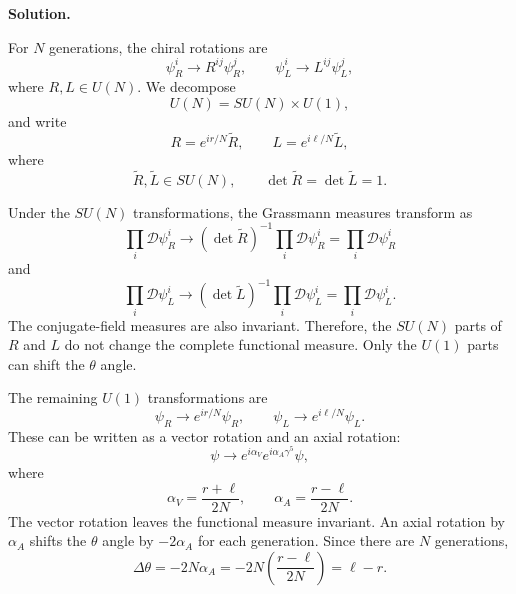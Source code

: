 \documentclass[a4paper,11pt]{article}
\newenvironment{solution}{\par\medskip\noindent\textbf{Solution.}\par\smallskip}{\par\medskip}
\begin{document}
\begin{solution}
For $N$ generations, the chiral rotations are
\begin{equation}
    \psi_R^i\to R^{ij}\psi_R^j,
    \qquad
    \psi_L^i\to L^{ij}\psi_L^j,
\end{equation}
where $R,L\in U(N)$. We decompose
\begin{equation}
    U(N)=SU(N)\times U(1),
\end{equation}
and write
\begin{equation}
    R=e^{ir/N}\widetilde R,
    \qquad
    L=e^{i\ell/N}\widetilde L,
\end{equation}
where
\begin{equation}
    \widetilde R,\widetilde L\in SU(N),
    \qquad
    \det\widetilde R=\det\widetilde L=1.
\end{equation}

Under the $SU(N)$ transformations, the Grassmann measures transform as
\begin{equation}
    \prod_i\mathcal D\psi_R^i
    \to
    (\det\widetilde R)^{-1}
    \prod_i\mathcal D\psi_R^i
    =
    \prod_i\mathcal D\psi_R^i
\end{equation}
and
\begin{equation}
    \prod_i\mathcal D\psi_L^i
    \to
    (\det\widetilde L)^{-1}
    \prod_i\mathcal D\psi_L^i
    =
    \prod_i\mathcal D\psi_L^i.
\end{equation}
The conjugate-field measures are also invariant. Therefore, the $SU(N)$
parts of $R$ and $L$ do not change the complete functional measure. Only the
$U(1)$ parts can shift the $\theta$ angle.

The remaining $U(1)$ transformations are
\begin{equation}
    \psi_R\to e^{ir/N}\psi_R,
    \qquad
    \psi_L\to e^{i\ell/N}\psi_L.
\end{equation}
These can be written as a vector rotation and an axial rotation:
\begin{equation}
    \psi\to e^{i\alpha_V}e^{i\alpha_A\gamma^5}\psi,
\end{equation}
where
\begin{equation}
    \alpha_V=\frac{r+\ell}{2N},
    \qquad
    \alpha_A=\frac{r-\ell}{2N}.
\end{equation}
The vector rotation leaves the functional measure invariant. An axial
rotation by $\alpha_A$ shifts the $\theta$ angle by $-2\alpha_A$ for each
generation. Since there are $N$ generations,
\begin{equation}
    \Delta\theta=-2N\alpha_A
    =-2N\left(\frac{r-\ell}{2N}\right)
    =\ell-r.
\end{equation}


\end{solution}
\end{document}
